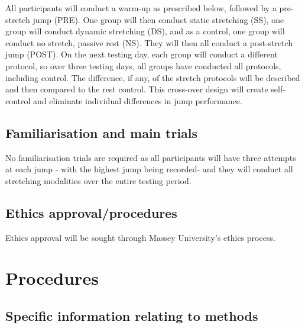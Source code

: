 \documentclass[stu, floatsintext, a4paper]{apa7}
\begin{document}
All participants will conduct a warm-up as prescribed below, followed by a pre-stretch jump (PRE). One group will then conduct static stretching (SS), one group will conduct dynamic stretching (DS), and as a control, one group will conduct no stretch, passive rest (NS). They will then all conduct a post-stretch jump (POST). On the next testing day, each group will conduct a different protocol, so over three testing days, all groups have conducted all protocols, including control. The difference, if any, of the stretch protocols will be described and then compared to the rest control. This cross-over design will create self-control and eliminate individual differences in jump performance.

\subsection{Familiarisation and main trials}
\label{sec:org963d763}

No familiarisation trials are required as all participants will have three attempts at each jump - with the highest jump being recorded- and they will conduct all stretching modalities over the entire testing period.

\subsection{Ethics approval/procedures}
\label{sec:org5a366b2}

Ethics approval will be sought through Massey University's ethics process.

\section{Procedures}
\label{sec:org3c1ec4e}

\subsection{Specific information relating to methods}
\label{sec:orga3a152c}
\end{document}
